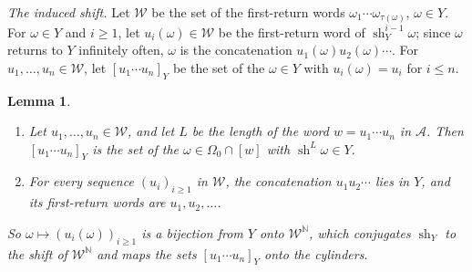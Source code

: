 \documentclass[11pt]{amsart}
\newtheorem{lemma}[proposition]{Lemma}
\theoremstyle{definition}
\theoremstyle{remark}
\newcommand{\N}{\mathbb N}
\begin{document}
\emph{The induced shift.}
Let $\mathcal W$ be the set of the first-return words $\omega_1\cdots\omega_{\tau(\omega)}$, $\omega\in Y$. For $\omega\in Y$ and $i\ge1$, let $u_i(\omega)\in\mathcal W$ be the first-return word of $\operatorname{sh}_Y^{i-1}\omega$; since $\omega$ returns to $Y$ infinitely often, $\omega$ is the concatenation $u_1(\omega)u_2(\omega)\cdots$. For $u_1,\dots,u_n\in\mathcal W$, let $[u_1\cdots u_n]_Y$ be the set of the $\omega\in Y$ with $u_i(\omega)=u_i$ for $i\le n$.

\begin{lemma}\label{lem:inducedshift}
\begin{enumerate}
\item[(i)] Let $u_1,\dots,u_n\in\mathcal W$, and let $L$ be the length of the word $w=u_1\cdots u_n$ in $\mathcal A$. Then $[u_1\cdots u_n]_Y$ is the set of the $\omega\in\Omega_0\cap[w]$ with $\operatorname{sh}^L\omega\in Y$.
\item[(ii)] For every sequence $(u_i)_{i\ge1}$ in $\mathcal W$, the concatenation $u_1u_2\cdots$ lies in $Y$, and its first-return words are $u_1,u_2,\dots$.
\end{enumerate}
So $\omega\mapsto(u_i(\omega))_{i\ge1}$ is a bijection from $Y$ onto $\mathcal W^{\N}$, which conjugates $\operatorname{sh}_Y$ to the shift of $\mathcal W^{\N}$ and maps the sets $[u_1\cdots u_n]_Y$ onto the cylinders.
\end{lemma}
\end{document}

